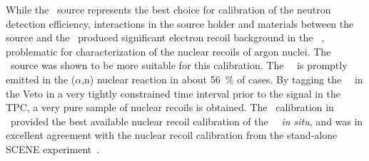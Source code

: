While the \AmC\ source represents the best choice for calibration of the neutron detection efficiency, interactions in the source holder and materials between the source and the \TPC\ produced significant electron recoil background in the \DSfs\ \TPC, problematic for characterization of the nuclear recoils of argon nuclei. The \AmBe\ source was shown to be more suitable for this calibration. The \AmBeGammaEnergy\ \gr\ is promptly emitted in the ($\alpha$,n) nuclear reaction in about \SI{56}{\percent} of cases. By tagging the \AmBeGammaEnergy\ \gr\ in the Veto in a very tightly constrained time interval prior to the signal in the TPC, a very pure sample of nuclear recoils is obtained. The \AmBe\ calibration in \DSfs\ provided the best available nuclear recoil calibration of the \DSfs\ \TPC\ {\it in situ}, and was in excellent agreement with the nuclear recoil calibration from the stand-alone SCENE experiment~\cite{Cao:2015ks}.



